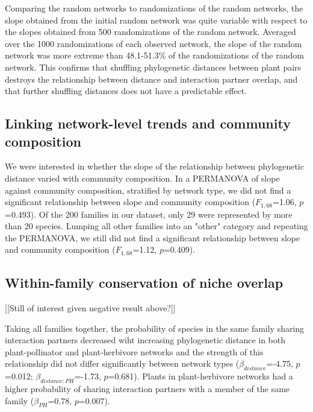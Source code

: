 \documentclass[12pt]{article}
\begin{document}
\begin{spacing}{1.5}
    Comparing the random networks to randomizations of the random networks, the slope obtained from the initial random network was quite variable with respect to the slopes obtained from 500 randomizations of the random network. Averaged over the 1000 randomizations of each observed network, the slope of the random network was more extreme than 48.1-51.3\% of the randomizations of the random network. This confirms that shuffling phylogenetic distances between plant pairs destroys the relationship between distance and interaction partner overlap, and that further shuffling distances does not have a predictable effect.


  \subsection*{Linking network-level trends and community composition} 

    We were interested in whether the slope of the relationship between phylogenetic distance varied with community composition. In a PERMANOVA of slope against community composition, stratified by network type, we did not find a significant relationship between slope and community composition ($F_{1,68}$=1.06, $p$=0.493). Of the 200 families in our dataset, only 29 were represented by more than 20 species. Lumping all other families into an "other" category and repeating the PERMANOVA, we still did not find a significant relationship between slope and community composition ($F_{1,68}$=1.12, $p$=0.409). 


  \subsection*{Within-family conservation of niche overlap} [[Still of interest given negative result above?]]

    Taking all families together, the probability of species in the same family sharing interaction partners decreased wiht increasing phylogenetic distance in both plant-pollinator and plant-herbivore networks and the strength of this relationship did not differ significantly between network types ($\beta_{distance}$=-4.75, $p$=0.012; $\beta_{distance:PH}$=-1.73, $p$=0.681). Plants in plant-herbivore networks had a higher probability of sharing interaction partners with a member of the same family ($\beta_{PH}$=0.78, $p$=0.007).



\end{spacing}
\end{document}
